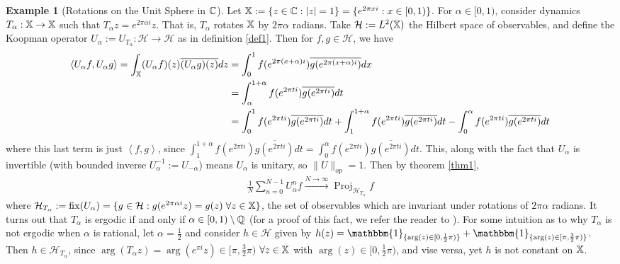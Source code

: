 \documentclass[11pt]{report}
\newcommand{\mc}[1]{\mathcal{#1}}
\newcommand{\ip}[2]{\left\langle#1,#2\right\rangle }
\newcommand{\1}[1]{\mathbbm{1}_{\{#1\}}}
\DeclareMathOperator{\fix}{fix}
\DeclareMathOperator{\proj}{Proj}
\theoremstyle{definition}
\newtheorem{example}{Example}
\begin{document}
    \begin{example}[Rotations on the Unit Sphere in $\mathbb{C}$]\label{ex1}
        Let $\mathbb{X}:=\{z\in\mathbb{C}:|z|=1\}=\{e^{2\pi xi}:x\in[0,1)\}$. For
        $\alpha\in[0,1)$, consider dynamics $T_\alpha:\mathbb{X}\rightarrow\mathbb{X}$
        such that $T_\alpha z=e^{2\pi\alpha i}z$. That is, $T_\alpha$ rotates
        $\mathbb{X}$ by $2\pi\alpha$ radians. Take $\mc{H}:=L^2(\mbb{X})$ the
        Hilbert space of observables, and define the Koopman operator
        $U_\alpha:= U_{T_\alpha}:\mc{H}\rightarrow\mc{H}$ as in definition
        \ref{def1}. Then for $f,g\in\mc{H}$, we have
        \begin{align*}
            \ip{U_\alpha f}{U_\alpha g}=\int_\mbb{X}(U_\alpha f)(z)\overline{(U_\alpha g)(z)}dz&=\int_0^1f(e^{2\pi(x+\alpha)i})\overline{g(e^{2\pi(x+\alpha)i})}dx\\
            &=\int_\alpha^{1+\alpha}f(e^{2\pi ti})\overline{g(e^{2\pi ti})}dt\\
            &=\int_{0}^{1}f(e^{2\pi ti})\overline{g(e^{2\pi ti})}dt+\int_{1}^{1+\alpha}f(e^{2\pi ti})\overline{g(e^{2\pi ti})}dt-\int_{0}^\alpha f(e^{2\pi ti})\overline{g(e^{2\pi ti})}dt
        \end{align*}
        where this last term is just $\ip{f}{g}$, since
        $\int_{1}^{1+\alpha}f(e^{2\pi ti})\overline{g(e^{2\pi
        ti})}dt=\int_{0}^\alpha f(e^{2\pi ti})\overline{g(e^{2\pi ti})}dt$.
        This, along with the fact that $U_\alpha$ is invertible (with bounded
        inverse $U^{-1}_\alpha:=U_{-\alpha}$) means $U_\alpha$ is unitary, so
        $\|U\|_{op}=1$. Then by theorem \ref{thm1},
        \begin{align*}
            \frac{1}{N}\sum_{n=0}^{N-1}U^n_\alpha f\overset{N\rightarrow\infty}{\longrightarrow}\proj_{\mc{H}_{T_\alpha}}f
        \end{align*}
        where $\mc{H}_{T_\alpha}:=\fix(U_\alpha)=\{g\in\mc{H}:g(e^{2\pi\alpha
        i}z)=g(z)\;\forall z\in\mbb{X}\}$, the set of observables which are
        invariant under rotations of $2\pi\alpha$ radians. It turns out that
        $T_\alpha$ is ergodic if and only if $\alpha\in[0,1)\setminus\mathbb{Q}$
        (for a proof of this fact, we refer the reader to
        \cite[proposition 7.15]{Eisner_Farkas_Haase_Nagel_2015}). For some
        intuition as to why $T_\alpha$ is not ergodic when $\alpha$ is rational,
        let $\alpha=\frac{1}{2}$ and consider $h\in\mc{H}$ given by
        $h(z)=\1{\arg(z)\in[0,\frac{1}{2}\pi)}+\1{\arg(z)\in[\pi,\frac{3}{2}\pi)}$.
        Then $h\in\mc{H}_{T_\alpha}$, since $\arg(T_\alpha z)=\arg(e^{\pi
        i}z)\in[\pi,\frac{3}{2}\pi)$ $\forall z\in\mathbb{X}$ with
        $\arg(z)\in[0,\frac{1}{2}\pi)$, and vise versa, yet $h$ is not constant
        on $\mathbb{X}$.
    \end{example}
\end{document}
